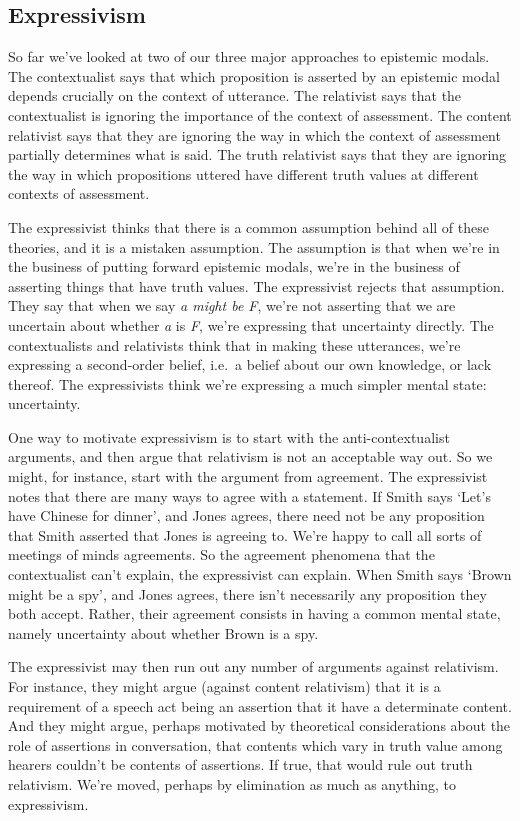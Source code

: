 \documentclass[
  11pt,
  letterpaper,
  DIV=11,
  numbers=noendperiod,
  twoside]{scrartcl}
\begin{document}
\subsection{Expressivism}\label{expressivism}

So far we've looked at two of our three major approaches to epistemic
modals. The contextualist says that which proposition is asserted by an
epistemic modal depends crucially on the context of utterance. The
relativist says that the contextualist is ignoring the importance of the
context of assessment. The content relativist says that they are
ignoring the way in which the context of assessment partially determines
what is said. The truth relativist says that they are ignoring the way
in which propositions uttered have different truth values at different
contexts of assessment.

The expressivist thinks that there is a common assumption behind all of
these theories, and it is a mistaken assumption. The assumption is that
when we're in the business of putting forward epistemic modals, we're in
the business of asserting things that have truth values. The
expressivist rejects that assumption. They say that when we say \emph{a
might be F}, we're not asserting that we are uncertain about whether
\emph{a} is \emph{F}, we're expressing that uncertainty directly. The
contextualists and relativists think that in making these utterances,
we're expressing a second-order belief, i.e.~a belief about our own
knowledge, or lack thereof. The expressivists think we're expressing a
much simpler mental state: uncertainty.

One way to motivate expressivism is to start with the anti-contextualist
arguments, and then argue that relativism is not an acceptable way out.
So we might, for instance, start with the argument from agreement. The
expressivist notes that there are many ways to agree with a statement.
If Smith says `Let's have Chinese for dinner', and Jones agrees, there
need not be any proposition that Smith asserted that Jones is agreeing
to. We're happy to call all sorts of meetings of minds agreements. So
the agreement phenomena that the contextualist can't explain, the
expressivist can explain. When Smith says `Brown might be a spy', and
Jones agrees, there isn't necessarily any proposition they both accept.
Rather, their agreement consists in having a common mental state, namely
uncertainty about whether Brown is a spy.

The expressivist may then run out any number of arguments against
relativism. For instance, they might argue (against content relativism)
that it is a requirement of a speech act being an assertion that it have
a determinate content. And they might argue, perhaps motivated by
theoretical considerations about the role of assertions in conversation,
that contents which vary in truth value among hearers couldn't be
contents of assertions. If true, that would rule out truth relativism.
We're moved, perhaps by elimination as much as anything, to
expressivism.
\end{document}
